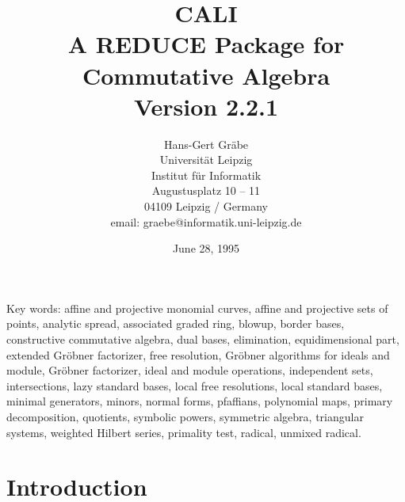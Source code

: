 
\date{June 28, 1995}

\textheight 21cm
\textwidth 15cm
\voffset -60pt
\hoffset -45pt

\newcommand{\gr}{Gr\"obner }
\newcommand{\x}{{\bf x}}
\newcommand{\ind}[1]{{\em #1}\index{#1}}
\newcommand{\pbx}[1]{\mbox{}\hfill \parbox[t]{12cm}{#1} \pagebreak[3]}
\newcommand{\nl}{\newline \hspace*{5mm}}

\makeindex

\title{CALI\\[20pt] A REDUCE Package for \\
    Commutative Algebra \\Version 2.2.1}

\author{
Hans-Gert Gr\"abe \\[15pt]
Universit\"at Leipzig\\
Institut f\"ur Informatik \\
Augustusplatz 10 -- 11\\
04109 Leipzig / Germany\\[20pt]
email: graebe@informatik.uni-leipzig.de}



\maketitle

\vfill
Key words:
affine and projective monomial curves,
affine and projective sets of points,
analytic spread,
associated graded ring,
blowup,
border bases,
constructive commutative algebra,
dual bases,
elimination,
equidimensional part,
extended \gr factorizer,
free resolution,
\gr algorithms for ideals and module,
\gr factorizer,
ideal and module operations,
independent sets,
intersections,
lazy standard bases,
local free resolutions,
local standard bases,
minimal generators,
minors,
normal forms,
pfaffians,
polynomial maps,
primary decomposition,
quotients,
symbolic powers,
symmetric algebra,
triangular systems,
weighted Hilbert series,
primality test,
radical,
unmixed radical.

\pagebreak

\tableofcontents

\pagebreak

\section{Introduction}

